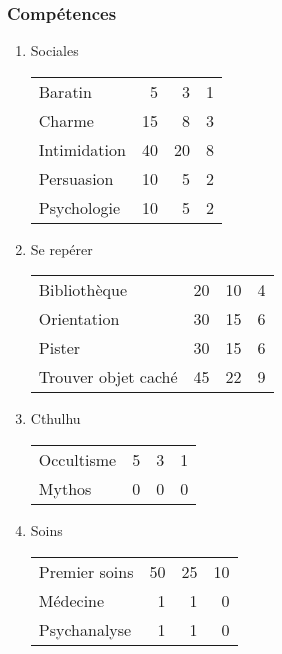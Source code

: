 \documentclass[11pt]{article}
\begin{document}
\begin{twocols}
\subsubsection{Compétences}
\label{sec:orga3774a1}
\begin{enumerate}
\item Sociales
\label{sec:org36a80f0}

\begin{center}
\begin{tabular}{lrrr}
Baratin & 5 & 3 & 1\\
Charme & 15 & 8 & 3\\
Intimidation & 40 & 20 & 8\\
Persuasion & 10 & 5 & 2\\
Psychologie & 10 & 5 & 2\\
\end{tabular}
\end{center}

\item Se repérer
\label{sec:org7285da7}

\begin{center}
\begin{tabular}{lrrr}
Bibliothèque & 20 & 10 & 4\\
Orientation & 30 & 15 & 6\\
Pister & 30 & 15 & 6\\
Trouver objet caché & 45 & 22 & 9\\
\end{tabular}
\end{center}

\item Cthulhu
\label{sec:org4c50880}

\begin{center}
\begin{tabular}{lrrr}
Occultisme & 5 & 3 & 1\\
Mythos & 0 & 0 & 0\\
\end{tabular}
\end{center}

\item Soins
\label{sec:org6ee87a8}

\begin{center}
\begin{tabular}{lrrr}
Premier soins & 50 & 25 & 10\\
Médecine & 1 & 1 & 0\\
Psychanalyse & 1 & 1 & 0\\
\end{tabular}
\end{center}


\end{enumerate}
\end{twocols}
\end{document}
